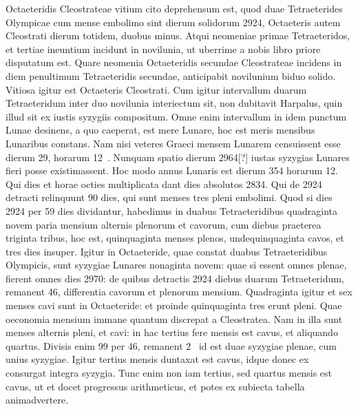 Octaeteridis Cleostrateae vitium cito deprehensum est,
quod duae Tetraeterides Olympicae cum mense embolimo sint
dierum solidorum 2924, Octaeteris autem Cleostrati dierum
totidem, duobus minus.
Atqui neomeniae primae Tetraeteridos, et tertiae
ineuntium incidunt in novilunia, ut uberrime a nobis libro priore
disputatum est.
Quare neomenia Octaeteridis secundae Cleostrateae
incidens in diem penultimum Tetraeteridis secundae, anticipabit novilunium
biduo solido.
Vitiosa igitur est Octaeteris Cleostrati.
Cum
igitur intervallum duarum Tetraeteridum inter duo novilunia interiectum
sit, non dubitavit Harpalus, quin illud sit ex iustis syzygiis compositum.
Omne enim intervallum in idem punctum Lunae desinens,
a quo caeperat, est mere Lunare, hoc est meris mensibus Lunaribus
constans.
Nam nisi veteres Graeci mensem Lunarem censuissent esse
dierum 29, horarum 12~.
Nunquam spatio dierum 2964[?] iustas syzygias
Lunares fieri posse existimassent.
Hoc modo annus Lunaris est
dierum 354 horarum 12.
Qui dies et horae octies multiplicata dant dies
absolutos 2834.
Qui de 2924 detracti relinquunt 90 dies, qui sunt
menses tres pleni embolimi.
Quod si dies 2924 per 59 dies dividantur,
habedimus in duabus Tetraeteridibus quadraginta novem paria
mensium alternis plenorum et cavorum, cum diebus praeterea triginta
tribus, hoc est, quinquaginta menses plenos, undequinquaginta
cavos, et tres dies insuper.
Igitur in Octaeteride, quae constat duabus
Tetraeteridibus Olympicis, sunt syzygiae Lunares nonaginta
novem: quae si essent omnes plenae, fierent omnes dies 2970: de quibus
detractis 2924 diebus duarum Tetraeteridum, remanent 46, differentia
cavorum et plenorum mensium.
Quadraginta igitur et sex
menses cavi sunt in Octaeteride: et proinde quinquaginta tres erunt
pleni.
Quae oeconomia mensium immane quantum discrepat a Cleostratea.
Nam in illa sunt menses alternis pleni, et cavi: in hac tertius
fere mensis est cavus, et aliquando quartus.
Divisis enim 99 per
46, remanent 2~ id est duae syzygiae plenae,
 cum  unius syzygiae.
Igitur tertius mensis duntaxat est cavus, idque donec ex
  consurgat
integra syzygia.
Tunc enim non iam tertius, sed quartus mensis est cavus,
ut et docet progressus arithmeticus, et potes ex subiecta tabella
animadvertere.

\begin{table}[htbp]
 
\end{table}

